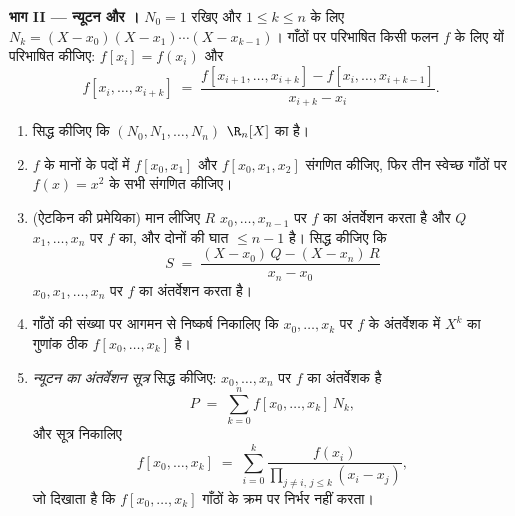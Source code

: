 \begin{problem}
\medskip \noindent\textbf{भाग II --- न्यूटन  और ।} $N_0 = 1$
रखिए और $1 \leq k \leq n$ के लिए $N_k = (X - x_0)(X - x_1) \cdots (X -
x_{k-1})$। गाँठों पर परिभाषित किसी फलन $f$ के लिए \emph{} यों
परिभाषित कीजिए: $f[x_i] = f(x_i)$ और
\[
f[x_i, \dots, x_{i+k}] \;=\;
\frac{f[x_{i+1}, \dots, x_{i+k}] - f[x_i, \dots, x_{i+k-1}]}
{x_{i+k} - x_i} .
\]
\begin{enumerate}[resume]
  \item सिद्ध कीजिए कि $(N_0, N_1, \dots, N_n)$ $\R_n[X]$ का  है।
  \item $f$ के मानों के पदों में $f[x_0, x_1]$ और $f[x_0, x_1, x_2]$ संगणित
  कीजिए, फिर तीन स्वेच्छ गाँठों पर $f(x) = x^2$ के सभी  संगणित
  कीजिए।
  \item (ऐटकिन की प्रमेयिका) मान लीजिए $R$ $x_0, \dots, x_{n-1}$ पर $f$ का
  अंतर्वेशन करता है और $Q$ $x_1, \dots, x_n$ पर $f$ का, और दोनों की घात
  $\leq n - 1$ है। सिद्ध कीजिए कि
        \[
        S \;=\; \frac{(X - x_0)\,Q - (X - x_n)\,R}{x_n - x_0}
        \]
        $x_0, x_1, \dots, x_n$ पर $f$ का अंतर्वेशन करता है।
  \item गाँठों की संख्या पर आगमन से निष्कर्ष निकालिए कि $x_0, \dots, x_k$ पर
  $f$ के अंतर्वेशक में $X^{k}$ का गुणांक ठीक $f[x_0, \dots, x_k]$ है।
  \item \emph{न्यूटन का अंतर्वेशन सूत्र} सिद्ध कीजिए: $x_0, \dots, x_n$ पर
  $f$ का अंतर्वेशक है
        \[
        P \;=\; \sum_{k=0}^{n} f[x_0, \dots, x_k]\, N_k ,
        \]
        और  सूत्र निकालिए
        \[
        f[x_0, \dots, x_k] \;=\; \sum_{i=0}^{k}
        \frac{f(x_i)}{\prod_{j \neq i,\, j \leq k} (x_i - x_j)} ,
        \]
        जो दिखाता है कि $f[x_0, \dots, x_k]$ गाँठों के क्रम पर निर्भर नहीं
        करता।
\end{enumerate}


\end{problem}
